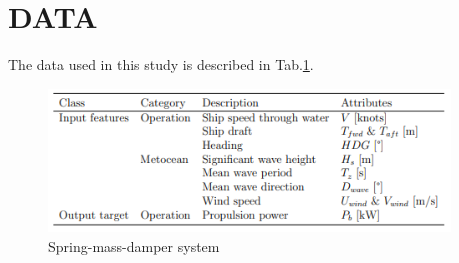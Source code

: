\section*{DATA}\label{data}
The data used in this study is described in
Tab.\ref{fig:data_description}.
\begin{figure}[H]
\begin{center}\includegraphics[width = 0.95\textwidth]{figures/data_description.png}\end{center}
\vspace{-0.7cm}
\caption{Spring-mass-damper system}
\label{fig:data_description}
\end{figure}
